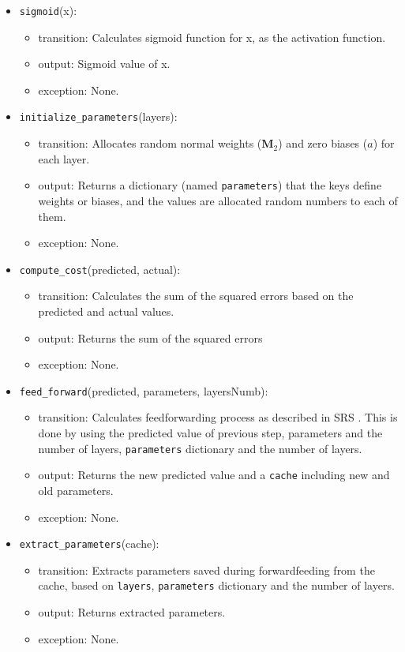 \documentclass[12pt, titlepage]{article}
\def\code#1{\texttt{#1}}
\begin{document}
\begin{itemize}
  \item \code{sigmoid}(x):
  \begin{itemize}
    \item transition: Calculates sigmoid function for x, as the activation function.
    \item output: Sigmoid value of x. 
    \item exception: None.
  \end{itemize}

  \item \code{initialize\_parameters}(layers):
  \begin{itemize}
    \item transition: Allocates random normal weights ($\mathbf{M}_{2}$) 
    and zero biases (${a}$) for each layer.
    \item output: Returns a dictionary (named \code{parameters}) 
    that the keys define weights or biases, and the values are allocated random numbers 
    to each of them.
    \item exception: None.
  \end{itemize}

  \item \code{compute\_cost}(predicted, actual):
  \begin{itemize}
    \item transition: Calculates the sum of the squared errors based on the 
    predicted and actual values.
    \item output: Returns the sum of the squared errors
    \item exception: None.
  \end{itemize}

  \item \code{feed\_forward}(predicted, parameters, layersNumb):
  \begin{itemize}
    \item transition: Calculates feedforwarding process as described in SRS \cite{SRS}. 
    This is done by using the predicted value of previous step, parameters and the number of layers, 
    \code{parameters} dictionary and the number of layers.
    \item output: Returns the new predicted value and a \code{cache} including new and old parameters.
    \item exception: None.
  \end{itemize}

  \item \code{extract\_parameters}(cache):
  \begin{itemize}
    \item transition: Extracts parameters saved during forwardfeeding from the cache, based on \code{layers},
    \code{parameters} dictionary and the number of layers.
    \item output: Returns extracted parameters.
    \item exception: None.
  \end{itemize}


\end{itemize}
\end{document}
